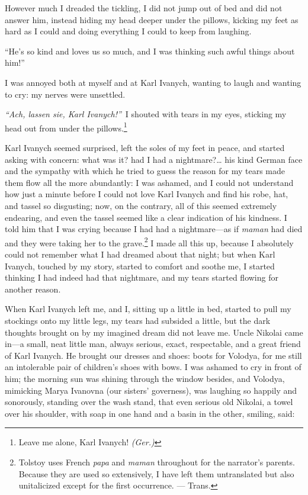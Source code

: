 However much I dreaded the tickling, I did not jump out of bed and did not answer him, instead hiding my head deeper under the pillows, kicking my feet as hard as I could and doing everything I could to keep from laughing.

``He's so kind and loves us so much, and I was thinking such awful things about him!'' %

I was annoyed both at myself and at Karl Ivanych, wanting to laugh and wanting to cry: my nerves were unsettled.

\textit{``Ach, lassen sie, Karl Ivanych!''}~I shouted with tears in my eyes, sticking my head out from under the pillows.\footnote{Leave me alone, Karl Ivanych! \textit{(Ger.)}} %

Karl Ivanych seemed surprised, left the soles of my feet in peace, and started asking with concern: what was it? had I had a nightmare?\ldots{} his kind German face and the sympathy with which he tried to guess the reason for my tears made them flow all the more abundantly: I was ashamed, and I could not understand how just a minute before I could not love Karl Ivanych and find his robe, hat, and tassel so disgusting; now, on the contrary, all of this seemed extremely endearing, and even the tassel seemed like a clear indication of his kindness. I told him that I was crying because I had had a nightmare---as if \textit{maman} had died and they were taking her to the grave.\footnote{Tolstoy uses French \textit{papa} and \textit{maman} throughout for the narrator's parents. Because they are used so extensively, I have left them untranslated but also unitalicized except for the first occurrence. --- Trans.} I made all this up, because I absolutely could not remember what I had dreamed about that night; but when Karl Ivanych, touched by my story, started to comfort and soothe me, I started thinking I had indeed had that nightmare, and my tears started flowing for another reason. 

When Karl Ivanych left me, and I, sitting up a little in bed, started to pull my stockings  onto my little legs, my tears had subsided a little, but the dark thoughts brought on by my imagined dream did not leave me. Uncle  Nikolai came in---a small, neat little man, always serious, exact, respectable,  and a great friend of Karl Ivanych. He brought our dresses and shoes: boots for Volodya, for me still an intolerable pair of children's shoes with bows.  I was ashamed to cry in front of him; the morning sun was shining through the window besides, and Volodya, mimicking Marya Ivanovna (our sisters' governess), was laughing so happily and sonorously, standing over the wash stand, that even serious old Nikolai, a towel over his shoulder, with soap in one hand and a basin in the other, smiling, said:

